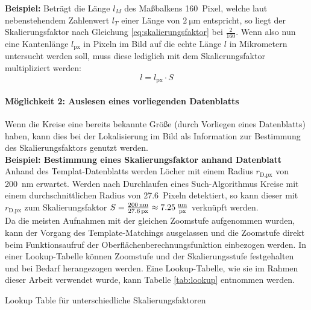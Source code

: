 \documentclass[accentcolor=tud1c, 11pt, toc=bib, toc=listof, captions=abovetable, parskip=half]{tudreport}
\begin{document}
\textbf{Beispiel:} Beträgt die Länge $l_M$ des Maßbalkens \SI{160}{Pixel}, welche laut nebenstehendem Zahlenwert $l_T$ einer Länge von $\SI{2}{\micro\metre}$ entspricht, so liegt der Skalierungsfaktor nach Gleichung \ref{eq:skalierungsfaktor} bei $\frac{2}{160}$.
Wenn also nun eine Kantenlänge $l_{\text{px}}$ in Pixeln im Bild auf die echte Länge $l$ in Mikrometern untersucht werden soll, muss diese lediglich mit dem Skalierungsfaktor multipliziert werden:\\

\begin{equation}
l = l_{\text{px}} \cdot S 
\label{eq:echteLänge}
\end{equation}

\paragraph{Möglichkeit 2: Auslesen eines vorliegenden Datenblatts}
Wenn die Kreise eine bereits bekannte Größe (durch Vorliegen eines Datenblatts) haben, kann dies bei der Lokalisierung im Bild als Information zur Bestimmung des Skalierungsfaktors genutzt werden.\\

\textbf{Beispiel: Bestimmung eines Skalierungsfaktor anhand Datenblatt}\\ 
Anhand des Templat-Datenblatts werden Löcher mit einem Radius $r_{\text{D,px}}$ von \SI{200}{\nano\metre} erwartet. Werden nach Durchlaufen eines Such-Algorithmus Kreise mit einem durchschnittlichen Radius von \SI{27.6}{Pixeln} detektiert, so kann dieser mit $r_{\text{D,px}}$ zum Skalierungsfaktor $S = \frac{\SI{200}{\nano\metre}}{\SI{27.6}{px}} \approx \SI{7.25}{\frac{\nano\metre}{px}}$ verknüpft werden. \\

Da die meisten Aufnahmen mit der gleichen Zoomstufe aufgenommen wurden, kann der Vorgang des Template-Matchings ausgelassen und die Zoomstufe direkt beim Funktionsaufruf der Oberflächenberechnungsfunktion einbezogen werden. In einer Lookup-Tabelle können Zoomstufe und der Skalierungsstufe festgehalten und bei Bedarf herangezogen werden. Eine Lookup-Tabelle, wie sie  im Rahmen dieser Arbeit verwendet wurde, kann Tabelle \ref{tab:lookup} entnommen werden. \\

\begin{table}[h!]
	\caption{Lookup Table für unterschiedliche Skalierungsfaktoren}
	\centering
	
	\label{tab:lookup}
\end{table}
\end{document}
